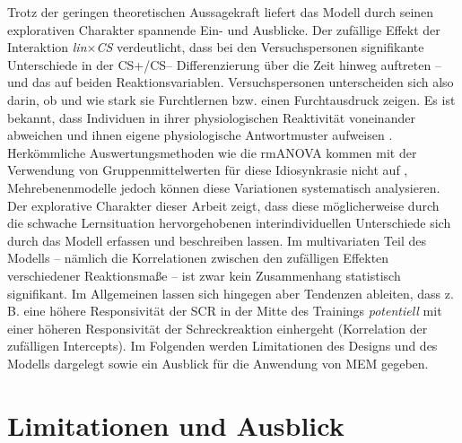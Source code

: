 	Trotz der geringen theoretischen Aussagekraft liefert das Modell durch seinen explorativen Charakter spannende Ein- und Ausblicke.
	Der zufällige Effekt der Interaktion \textit{lin$\times$CS} verdeutlicht, dass bei den Versuchspersonen signifikante Unterschiede in der CS+/CS-- Differenzierung über die Zeit hinweg auftreten -- und das auf beiden Reaktionsvariablen. Versuchspersonen unterscheiden sich also darin, ob und wie stark sie Furchtlernen bzw. einen Furchtausdruck zeigen. 
	Es ist bekannt, dass Individuen in ihrer physiologischen Reaktivität voneinander abweichen und ihnen eigene physiologische Antwortmuster aufweisen \parencite[z.\,B.][]{LACEY1958, ENGEL1960}. 
	Herkömmliche Auswertungsmethoden wie die rmANOVA kommen mit der Verwendung von Gruppenmittelwerten  für diese Idiosynkrasie nicht auf \parencite[z.\,B.][]{KRISTJANSSON2007}, Mehrebenenmodelle jedoch können diese Variationen systematisch analysieren. %
	Der explorative Charakter dieser Arbeit zeigt, dass diese möglicherweise durch die schwache Lernsituation hervorgehobenen interindividuellen Unterschiede sich durch das Modell erfassen und beschreiben lassen.
	Im multivariaten Teil des Modells -- nämlich die Korrelationen zwischen den zufälligen Effekten verschiedener Reaktionsmaße -- ist zwar kein Zusammenhang statistisch signifikant. Im Allgemeinen lassen sich hingegen aber Tendenzen ableiten, dass z.\,B. eine höhere Responsivität der SCR in der Mitte des Trainings \textit{potentiell} mit einer höheren Responsivität der Schreckreaktion einhergeht (Korrelation der zufälligen Intercepts). Im Folgenden werden Limitationen des Designs und des Modells dargelegt sowie ein Ausblick für die Anwendung von MEM gegeben.




\section{Limitationen und Ausblick}		\label{limitation}

